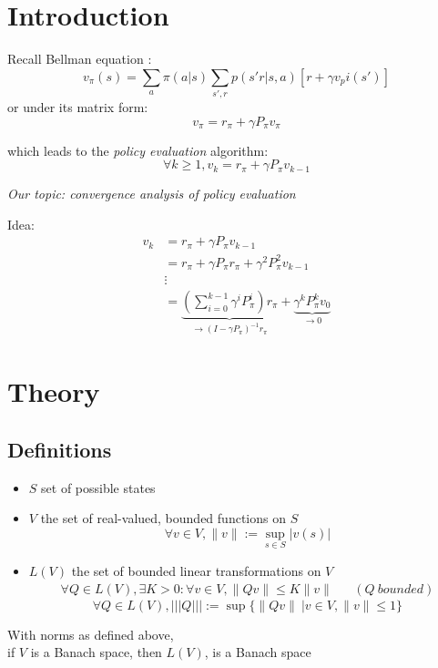 \documentclass{beamer}
\begin{document}
\section{Introduction}
	\begin{frame}
		Recall Bellman equation :
		\[
		v_{\pi}(s) = \sum_{a} \pi(a|s) \sum_{s',r}p(s'r|s,a)[r+\gamma v_pi(s')]
		\]
		or under its matrix form:
		\[
			v_{\pi} = r_{\pi} + \gamma P_{\pi} v_{\pi}		
		\]
	
		which leads to the \emph{policy evaluation} algorithm:
		\[
		\boxed{\ \ \ 
			\forall k\geq 1, v_{k} = r_{\pi} + \gamma P_{\pi} v_{k-1}
		\ \ \ }
		\]
		\begin{center}
		\emph{Our topic: convergence analysis of policy evaluation}
		\end{center}
		
	\end{frame}
	\begin{frame}
		Idea:
		\begin{align*}
		v_{k} &= r_{\pi} + \gamma P_{\pi} v_{k-1}\\
		&=r_{\pi} + \gamma P_{\pi} r_{\pi} + \gamma^{2} P_{\pi}^{2} v_{k-1}\\
		& \vdots \\
		&= \underbrace{\left(\sum_{i=0}^{k-1} \gamma^{i} P_{\pi}^{i}\right) r_{\pi}}_{\rightarrow (I-\gamma P_{\pi})^{-1}r_{\pi}}  + \underbrace{\gamma^{k} P_{\pi}^{k}v_{0}}_{\rightarrow 0}
		\end{align*}
	\end{frame}
\section{Theory}
	\subsection{Definitions}
		\begin{frame}
		
			\begin{definition}
				\begin{itemize}
					\item $S$ set of possible states
					\item $V$ the set of real-valued, bounded functions on $S$
					\[
						\forall v \in V, \| v \| := \sup_{s \in S} | v(s) |		
					\]
					\item $L(V)$ the set of bounded linear transformations on $V$
					\begin{align*}
						\forall Q \in L(V), \exists K>0: \forall v \in V, \| Qv \| \leq K \| v \| &	& (Q \ bounded)		
					\end{align*}
					\[
						\forall Q \in L(V), ||| Q ||| := \sup \{ \| Qv \| \ \big| v \in V, \| v \|  \leq 1\}	
					\]
				\end{itemize}
			\end{definition}
			
			\begin{theorem}
				With norms as defined above, \\
				if $V$ is a Banach space, then $L(V)$, is a Banach space
			\end{theorem}
		\end{frame}
	
\end{document}
